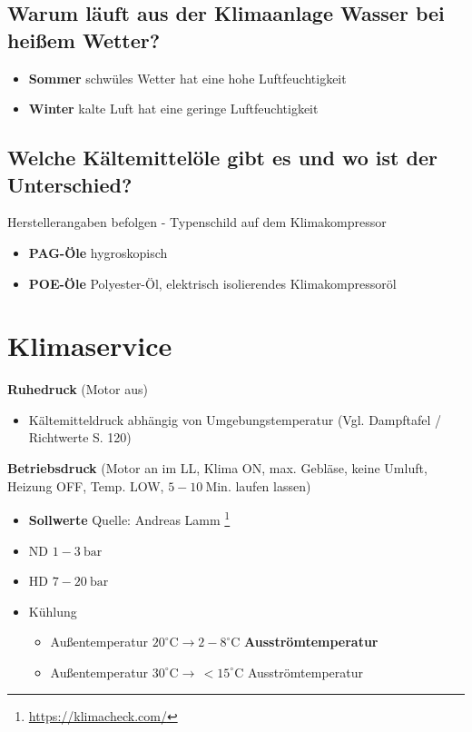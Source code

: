 \subsection{Warum läuft aus der Klimaanlage Wasser bei heißem
Wetter?}\label{warum-laeuft-aus-der-klimaanlage-wasser-bei-heissem-wetter}

\begin{itemize}
\item
  \textbf{Sommer} schwüles Wetter hat eine hohe Luftfeuchtigkeit
\item
  \textbf{Winter} kalte Luft hat eine geringe Luftfeuchtigkeit
\end{itemize}

\subsection{Welche Kältemittelöle gibt es und wo ist der
Unterschied?}\label{welche-kaeltemitteloele-gibt-es-und-wo-ist-der-unterschied}

Herstellerangaben befolgen - Typenschild auf dem Klimakompressor

\begin{itemize}
\item
  \textbf{PAG-Öle} hygroskopisch
\item
  \textbf{POE-Öle} Polyester-Öl, elektrisch isolierendes
  Klimakompressoröl
\end{itemize}

\newpage

\section{Klimaservice}\label{klimaservice}

\textbf{Ruhedruck} (Motor aus)

\begin{itemize}
\item
  Kältemitteldruck abhängig von Umgebungstemperatur (Vgl. Dampftafel /
  Richtwerte \textcite{schmidt:2015:klima} S. 120)
\end{itemize}

\textbf{Betriebsdruck} (Motor an im LL, Klima ON, max. Gebläse, keine
Umluft, Heizung OFF, Temp. LOW, $5 - 10~\text{Min.}$ laufen lassen)

\begin{itemize}
\item
  \textbf{Sollwerte} Quelle: Andreas Lamm \footnote{\url{https://klimacheck.com/}}
\item
  ND $1 - 3~\text{bar}$
\item
  HD $7 - 20~\text{bar}$
\item
  Kühlung

  \begin{itemize}
  \item
    Außentemperatur $20^\circ \text{C} \to 2 - 8^\circ \text{C}$
    \textbf{Ausströmtemperatur}
  \item
    Außentemperatur $30^\circ \text{C} \to \, <15^\circ \text{C}$
    Ausströmtemperatur
  \end{itemize}
\end{itemize}

